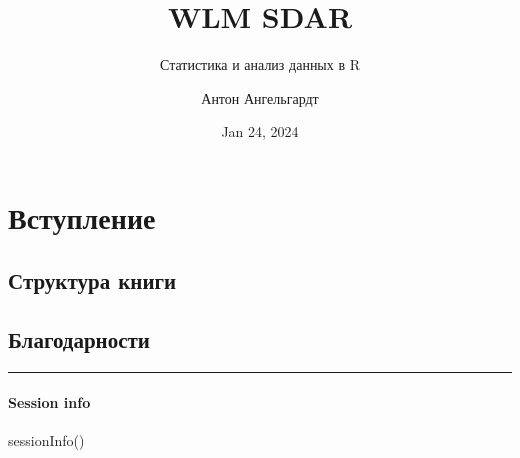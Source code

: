 \documentclass[
  letterpaper,
  DIV=11,
  numbers=noendperiod]{scrreprt}
\title{WLM SDAR}
\subtitle{Статистика и анализ данных в R}
\author{Антон Ангельгардт}
\date{Jan 24, 2024}
\newenvironment{Shaded}{}{}
\newcommand{\FunctionTok}[1]{\textcolor[rgb]{0.44,0.26,0.76}{#1}}
\newcommand{\NormalTok}[1]{\textcolor[rgb]{0.14,0.16,0.18}{#1}}
\renewcommand*\contentsname{Содержание}
\newcommand\contentsname{Содержание}
\theoremstyle{definition}
\theoremstyle{remark}
\begin{document}
\maketitle
\renewcommand*\contentsname{Содержание}
{
\hypersetup{linkcolor=}
\setcounter{tocdepth}{2}
\tableofcontents
}

\chapter*{Вступление}\label{preface}


\section*{Структура книги}\label{book_structure}


\section*{Благодарности}\label{thanks}


\begin{center}\rule{0.5\linewidth}{0.5pt}\end{center}

\subsubsection*{Session info}\label{session-info}

\begin{Shaded}
\begin{Highlighting}[]
\FunctionTok{sessionInfo}\NormalTok{()}
\end{Highlighting}
\end{Shaded}
\end{document}
